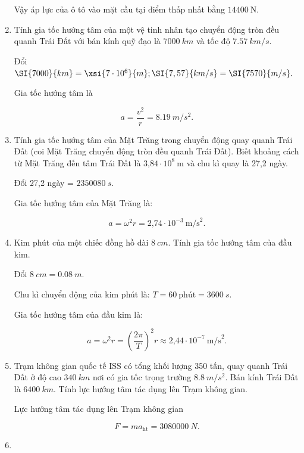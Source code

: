 \begin{enumerate}[label=\bfseries Câu \arabic*:]
{		Vậy áp lực của ô tô vào mặt cầu tại điểm thấp nhất bằng $\SI{14400}{\newton}$.
	}
	\item {}
	
	
	{
		Tính gia tốc hướng tâm của một vệ tinh nhân tạo chuyển động tròn đều quanh Trái Đất với bán kính quỹ đạo là $\SI{7000}{km}$ và tốc độ $\SI{7,57}{km/s}.$
		
	}
	
	\hideall
	{	
		Đổi $\SI{7000}{km} = \xsi{7\cdot 10^6}{m}; \SI{7,57}{km/s} = \SI{7570}{m/s}.$
		
		Gia tốc hướng tâm là
		
		$$a = \dfrac{v^2}{r} = \SI{8,19}{m/s^2}.$$
	}
	\item {}
	
	
	{
		Tính gia tốc hướng tâm của Mặt Trăng trong chuyển động quay quanh Trái Đất (coi Mặt Trăng chuyển động tròn đều quanh Trái Đất). Biết khoảng cách từ Mặt Trăng đến tâm Trái Đất là $\text{3,84}\cdot 10^8\ \text{m}$ và chu kì quay là 27,2 ngày.
	}
	
	\hideall
	{	
		Đổi 27,2 ngày = $\SI{2 350 080}{s}.$
		
		Gia tốc hướng tâm của Mặt Trăng là:
		
		$$a = \omega^2 r = \text{2,74}\cdot 10^{-3}\ \text{m/s}^2.$$
	}
	\item {}
	
	
	{
		Kim phút của một chiếc đồng hồ dài $\SI{8}{cm}$. Tính gia tốc hướng tâm của đầu kim.
	}
	
	\hideall
	{	
		Đổi $\SI{8}{cm} = \SI{0,08}{m}.$
		
		
		Chu kì chuyển động của kim phút là: $T = 60\ \text{phút} = \SI{3600}{s}.$
		
		Gia tốc hướng tâm của đầu kim là:
		
		$$a = \omega^2 r = \left(\dfrac{2\pi}{T}\right)^2 r \approx \text{2,44} \cdot 10^{-7}\ \text{m/s}^2.$$
	}
	
	\item {}
	
	
	{
		Trạm không gian quốc tế ISS có tổng khối lượng 350 tấn, quay quanh Trái Đất ở độ cao $\SI{340}{km}$ nơi có gia tốc trọng trường $\SI{8,8}{m/s^2}$. Bán kính Trái Đất là $\SI{6400}{km}$. Tính lực hướng tâm tác dụng lên Trạm không gian.
	}
	
	\hideall
	{	
		Lực hướng tâm tác dụng lên Trạm không gian
		
		$$F = ma_\text{ht} = \SI{3080000}{N}.$$
	}
	\item {}
	

\end{enumerate}
